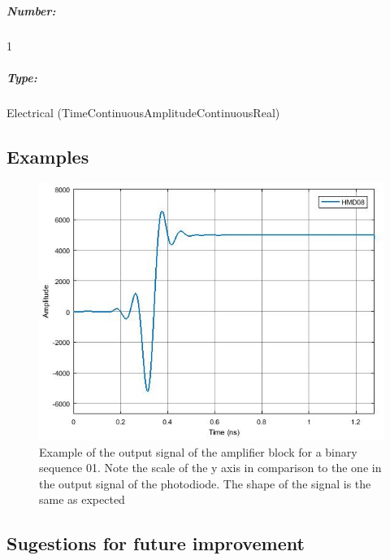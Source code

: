 \documentclass[a4paper]{article}
\begin{document}
\subparagraph*{Number:} 1

\subparagraph*{Type:} Electrical (TimeContinuousAmplitudeContinuousReal)

\subsection*{Examples} 

\begin{figure}[h]
	\centering
	\includegraphics[width=\textwidth]{TIAmplifier_output}
	\caption{Example of the output signal of the amplifier block for a binary sequence 01. Note the scale of the y axis in comparison to the one in the output signal of the photodiode. The shape of the signal is the same as expected}\label{TIAmplifier_output}
\end{figure}

\subsection*{Sugestions for future improvement}
\end{document}
